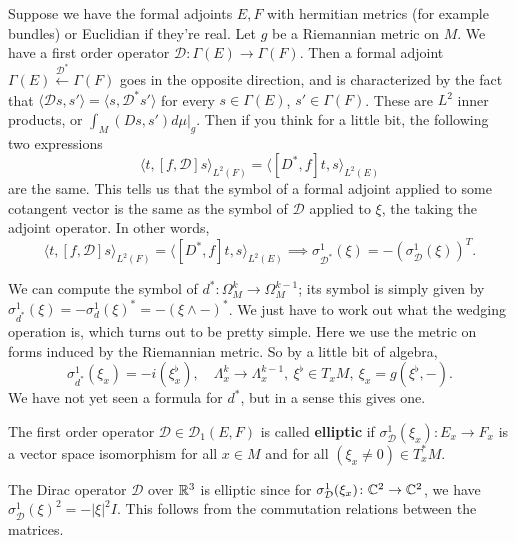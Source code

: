 \begin{example}
    Suppose we have the formal adjoints $E,F$ with hermitian metrics (for example bundles) or Euclidian if they're real. Let $g$ be a Riemannian metric on $M$. We have a first order operator $\mathcal D \colon \Gamma (E) \to \Gamma (F)$. Then a formal adjoint $\Gamma (E)\xleftarrow{\mathcal D^*} \Gamma (F)$ goes in the opposite direction, and is characterized by the fact that $\langle \mathcal D s, s' \rangle = \langle s, \mathcal D^* s' \rangle $ for  every $s \in \Gamma (E)$, $s' \in \Gamma (F)$. These are $L^2$ inner products, or $\int_M \left. (Ds,s') d\mu \right| _g$. Then if you think for a little bit, the following two expressions\[
            \langle t, [f,\mathcal D]s \rangle _{L^2(F)}= \langle [D^*,f]t,s \rangle _{L^2(E)}
    \] are the same. This tells us that the symbol of a formal adjoint applied to some cotangent vector is the same as the symbol of $\mathcal D$ applied to $\xi$, the taking the adjoint operator. In other words, \[
            \langle t, [f,\mathcal D]s \rangle _{L^2(F)}= \langle [D^*,f]t,s \rangle _{L^2(E)} \implies 
    \sigma^1 _{\mathcal D^*}(\xi) = -(\sigma^1_{\mathcal D}(\xi))^T.
    \] 
\end{example}
\begin{example}
    We can compute the symbol of $d^* \colon \Omega^k_M \to \Omega^{k-1}_M$; its symbol is simply given by $\sigma^1_{d^*}(\xi) = - \sigma^1_d(\xi)^* = -(\xi \wedge - )^*$. We just have to work out what the wedging operation is, which turns out to be pretty simple. Here we use the metric on forms induced by the Riemannian metric. So by a little bit of algebra, \[
        \sigma^1_{d^*}(\xi_x) = -i(\xi^{\flat}_x),\quad  \Lambda ^k _x \to \Lambda  ^{k-1}_x,\ \xi^{\flat}\in T_x M,\ \xi_x = g(\xi^{\flat}, -).
    \] We have not yet seen a formula for $d^*$, but in a sense this gives one.
\end{example}
\begin{definition}[]
    The first order operator $\mathcal D \in \mathcal D_1(E,F)$ is called \textbf{elliptic} if $\sigma^1_{\mathcal D}(\xi_x) \colon E_x \to F_x$ is a vector space isomorphism for all $x \in M$ and for all $(\xi_x \neq 0) \in T_x ^* M$.
\end{definition}
\begin{example}
    The Dirac operator $\mathcal D$ over $\mathbb{R}^3$ is elliptic since for $\sigma^1 _{\mathcal D}(\xi_x) \colon \mathbb{C}^2 \to \mathbb{C}^2$, we have $\sigma^1_{\mathcal D}(\xi)^2 = - |\xi|^2I$. This follows from the commutation relations between the matrices.
\end{example}
